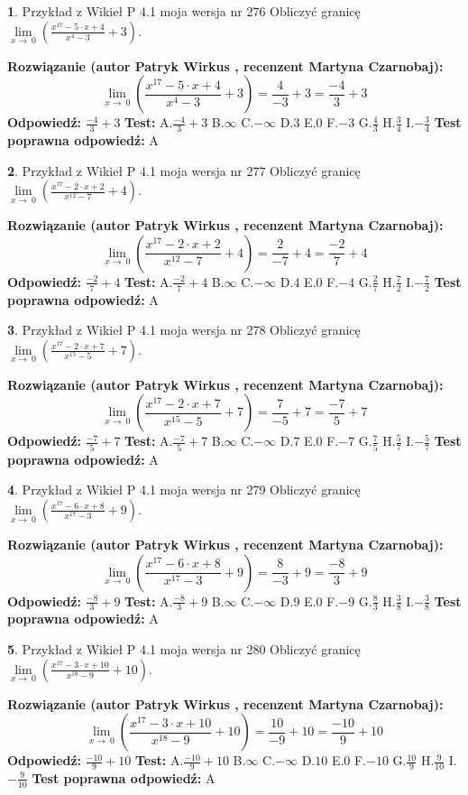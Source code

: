 \documentclass[12pt, a4paper]{article}
\theoremstyle{definition} %
\newtheorem{zad}{}
\newcommand{\zadStart}[1]{\begin{zad}#1\newline}
\newcommand{\zadStop}{\end{zad}}
\newcommand{\rozwStart}[2]{\noindent \textbf{Rozwiązanie (autor #1 , recenzent #2): }\newline}
\newcommand{\rozwStop}{\newline}
\newcommand{\odpStart}{\noindent \textbf{Odpowiedź:}\newline}
\newcommand{\odpStop}{\newline}
\newcommand{\testStart}{\noindent \textbf{Test:}\newline}
\newcommand{\testStop}{\newline}
\newcommand{\kluczStart}{\noindent \textbf{Test poprawna odpowiedź:}\newline}
\newcommand{\kluczStop}{\newline}
\begin{document}
\zadStart{Przykład z Wikieł P 4.1 moja wersja nr 276}
Obliczyć granicę $\lim\limits_{x\to\ 0}(\frac{x^{17}-5 \cdot x +4}{x^{4}-3}+3)$.
\zadStop
\rozwStart{Patryk Wirkus}{Martyna Czarnobaj}
$$\lim\limits_{x\to\ 0}(\frac{x^{17}-5 \cdot x +4}{x^{4}-3}+3)=\frac{4}{-3}+3=\frac{-4}{3}+3$$
\rozwStop
\odpStart
$\frac{-4}{3}+3$
\odpStop
\testStart
A.$\frac{-4}{3}+3$
B.$\infty$
C.$-\infty$
D.$3$
E.$0$
F.$-3$
G.$\frac{4}{3}$
H.$\frac{3}{4}$
I.$-\frac{3}{4}$
\testStop
\kluczStart
A
\kluczStop



\zadStart{Przykład z Wikieł P 4.1 moja wersja nr 277}
Obliczyć granicę $\lim\limits_{x\to\ 0}(\frac{x^{17}-2 \cdot x +2}{x^{12}-7}+4)$.
\zadStop
\rozwStart{Patryk Wirkus}{Martyna Czarnobaj}
$$\lim\limits_{x\to\ 0}(\frac{x^{17}-2 \cdot x +2}{x^{12}-7}+4)=\frac{2}{-7}+4=\frac{-2}{7}+4$$
\rozwStop
\odpStart
$\frac{-2}{7}+4$
\odpStop
\testStart
A.$\frac{-2}{7}+4$
B.$\infty$
C.$-\infty$
D.$4$
E.$0$
F.$-4$
G.$\frac{2}{7}$
H.$\frac{7}{2}$
I.$-\frac{7}{2}$
\testStop
\kluczStart
A
\kluczStop



\zadStart{Przykład z Wikieł P 4.1 moja wersja nr 278}
Obliczyć granicę $\lim\limits_{x\to\ 0}(\frac{x^{17}-2 \cdot x +7}{x^{15}-5}+7)$.
\zadStop
\rozwStart{Patryk Wirkus}{Martyna Czarnobaj}
$$\lim\limits_{x\to\ 0}(\frac{x^{17}-2 \cdot x +7}{x^{15}-5}+7)=\frac{7}{-5}+7=\frac{-7}{5}+7$$
\rozwStop
\odpStart
$\frac{-7}{5}+7$
\odpStop
\testStart
A.$\frac{-7}{5}+7$
B.$\infty$
C.$-\infty$
D.$7$
E.$0$
F.$-7$
G.$\frac{7}{5}$
H.$\frac{5}{7}$
I.$-\frac{5}{7}$
\testStop
\kluczStart
A
\kluczStop



\zadStart{Przykład z Wikieł P 4.1 moja wersja nr 279}
Obliczyć granicę $\lim\limits_{x\to\ 0}(\frac{x^{17}-6 \cdot x +8}{x^{17}-3}+9)$.
\zadStop
\rozwStart{Patryk Wirkus}{Martyna Czarnobaj}
$$\lim\limits_{x\to\ 0}(\frac{x^{17}-6 \cdot x +8}{x^{17}-3}+9)=\frac{8}{-3}+9=\frac{-8}{3}+9$$
\rozwStop
\odpStart
$\frac{-8}{3}+9$
\odpStop
\testStart
A.$\frac{-8}{3}+9$
B.$\infty$
C.$-\infty$
D.$9$
E.$0$
F.$-9$
G.$\frac{8}{3}$
H.$\frac{3}{8}$
I.$-\frac{3}{8}$
\testStop
\kluczStart
A
\kluczStop



\zadStart{Przykład z Wikieł P 4.1 moja wersja nr 280}
Obliczyć granicę $\lim\limits_{x\to\ 0}(\frac{x^{17}-3 \cdot x +10}{x^{18}-9}+10)$.
\zadStop
\rozwStart{Patryk Wirkus}{Martyna Czarnobaj}
$$\lim\limits_{x\to\ 0}(\frac{x^{17}-3 \cdot x +10}{x^{18}-9}+10)=\frac{10}{-9}+10=\frac{-10}{9}+10$$
\rozwStop
\odpStart
$\frac{-10}{9}+10$
\odpStop
\testStart
A.$\frac{-10}{9}+10$
B.$\infty$
C.$-\infty$
D.$10$
E.$0$
F.$-10$
G.$\frac{10}{9}$
H.$\frac{9}{10}$
I.$-\frac{9}{10}$
\testStop
\kluczStart
A
\kluczStop
\end{document}
